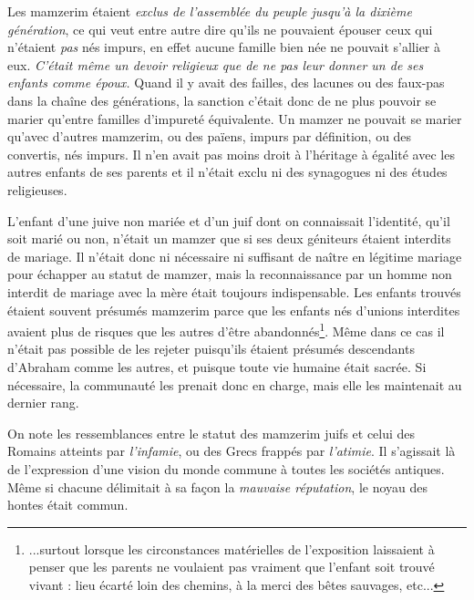  Les mamzerim étaient \emph{exclus de l'assemblée du peuple jusqu'à la dixième génération}, ce qui veut entre autre dire qu'ils ne pouvaient épouser ceux qui n'étaient \emph{pas} nés impurs, en effet aucune famille bien née ne pouvait s'allier à eux. \emph{C'était même un devoir religieux que de ne pas leur donner un de ses enfants comme époux.} Quand il y avait des failles, des lacunes ou des faux-pas dans la chaîne des générations, la sanction c'était donc de ne plus pouvoir se marier qu'entre familles d'impureté équivalente. Un mamzer ne pouvait se marier qu'avec d'autres mamzerim, ou des païens, impurs par définition, ou des convertis, nés impurs. Il n'en avait pas moins droit à l'héritage à égalité avec les autres enfants de ses parents et il n'était exclu ni des synagogues ni des études religieuses.
 
 L'enfant d'une juive non mariée et d'un juif dont on connaissait l'identité, qu'il soit marié ou non, n'était un mamzer que si ses deux géniteurs étaient interdits de mariage. Il n'était donc ni nécessaire ni suffisant de naître en légitime mariage pour échapper au statut de mamzer, mais la reconnaissance par un homme non interdit de mariage avec la mère était toujours indispensable. Les enfants trouvés étaient souvent présumés mamzerim parce que les enfants nés d'unions interdites avaient plus de risques que les autres d'être abandonnés\footnote{...surtout lorsque les circonstances matérielles de l'exposition laissaient à penser que les parents ne voulaient pas vraiment que l'enfant soit trouvé vivant : lieu écarté loin des chemins, à la merci des bêtes sauvages, etc...}. Même dans ce cas il n'était pas possible de les rejeter puisqu'ils étaient présumés descendants d'Abraham comme les autres, et puisque toute vie humaine était sacrée. Si nécessaire, la communauté les prenait donc en charge, mais elle les maintenait au dernier rang.


 On note les ressemblances entre le statut des mamzerim juifs et celui des Romains atteints par \emph{l'infamie}, ou des Grecs frappés par \emph{l'atimie}. Il s'agissait là de l'expression d'une vision du monde commune à toutes les sociétés antiques. Même si chacune délimitait à sa façon la \emph{mauvaise réputation}, le noyau des hontes était commun. 


